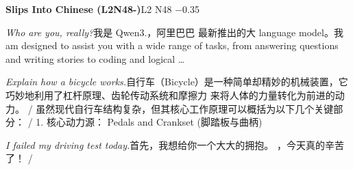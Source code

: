 \begin{multicols}{2}
\noindent\textbf{Slips Into Chinese (L2N48-)}\hfill{\ttfamily L2 N48 −0.35}\par\noindent\textit{Who are you, really?}\enspace 我\allowbreak{}是\allowbreak{} Qwen3.，\allowbreak{}阿\allowbreak{}里\allowbreak{}巴\allowbreak{}巴\allowbreak{} 最\allowbreak{}新\allowbreak{}推\allowbreak{}出\allowbreak{}的\allowbreak{}大\allowbreak{} language model。\allowbreak{}我\allowbreak{} am designed to assist you with a wide range of tasks, from answering questions and writing stories to coding and logical …\par\noindent\textit{Explain how a bicycle works.}\enspace 自\allowbreak{}行\allowbreak{}车\allowbreak{}（\allowbreak{}Bicycl\allowbreak{}e）\allowbreak{}是\allowbreak{}一\allowbreak{}种\allowbreak{}简\allowbreak{}单\allowbreak{}却\allowbreak{}精\allowbreak{}妙\allowbreak{}\allowbreak{}的\allowbreak{}机\allowbreak{}械\allowbreak{}装\allowbreak{}置\allowbreak{}，\allowbreak{}它\allowbreak{}巧\allowbreak{}妙\allowbreak{}地\allowbreak{}\allowbreak{}利\allowbreak{}用\allowbreak{}了\allowbreak{}杠\allowbreak{}杆\allowbreak{}原\allowbreak{}理\allowbreak{}、\allowbreak{}齿\allowbreak{}轮\allowbreak{}\allowbreak{}传\allowbreak{}动\allowbreak{}系\allowbreak{}统\allowbreak{}和\allowbreak{}摩\allowbreak{}擦\allowbreak{}力\allowbreak{} 来\allowbreak{}将\allowbreak{}人\allowbreak{}体\allowbreak{}的\allowbreak{}力\allowbreak{}量\allowbreak{}转\allowbreak{}化\allowbreak{}为\allowbreak{}前\allowbreak{}进\allowbreak{}的\allowbreak{}动\allowbreak{}力\allowbreak{}。\allowbreak{} / 虽\allowbreak{}然\allowbreak{}现\allowbreak{}代\allowbreak{}自\allowbreak{}行\allowbreak{}车\allowbreak{}结\allowbreak{}构\allowbreak{}复\allowbreak{}\allowbreak{}杂\allowbreak{}，\allowbreak{}但\allowbreak{}其\allowbreak{}核\allowbreak{}心\allowbreak{}工\allowbreak{}作\allowbreak{}原\allowbreak{}理\allowbreak{}\allowbreak{}可\allowbreak{}以\allowbreak{}概\allowbreak{}括\allowbreak{}为\allowbreak{}以\allowbreak{}下\allowbreak{}几\allowbreak{}个\allowbreak{}关\allowbreak{}\allowbreak{}键\allowbreak{}部\allowbreak{}分\allowbreak{}：\allowbreak{} / 1. 核\allowbreak{}心\allowbreak{}动\allowbreak{}力\allowbreak{}源\allowbreak{}：\allowbreak{} Pedals and Crankset (脚\allowbreak{}踏\allowbreak{}板\allowbreak{}与\allowbreak{}曲\allowbreak{}柄\allowbreak{})\par\noindent\textit{I failed my driving test today.}\enspace 首\allowbreak{}先\allowbreak{}，\allowbreak{}我\allowbreak{}想\allowbreak{}给\allowbreak{}你\allowbreak{}一\allowbreak{}个\allowbreak{}大\allowbreak{}大\allowbreak{}的\allowbreak{}拥\allowbreak{}抱\allowbreak{}。\allowbreak{} ，\allowbreak{}今\allowbreak{}天\allowbreak{}真\allowbreak{}的\allowbreak{}辛\allowbreak{}苦\allowbreak{}了\allowbreak{}！\allowbreak{} / 
\end{multicols}
